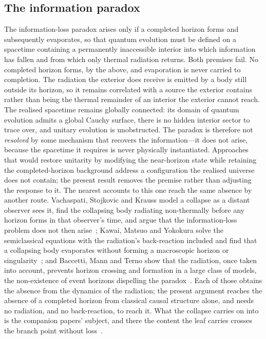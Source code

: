 \documentclass[11pt,a4paper]{article}
\theoremstyle{plain}
\theoremstyle{remark}
\begin{document}
\subsection*{The information paradox}
The information-loss paradox arises only if a completed horizon forms and subsequently evaporates, so that quantum evolution must be defined on a spacetime containing a permanently inaccessible interior into which information has fallen and from which only thermal radiation returns. Both premises fail. No completed horizon forms, by the above, and evaporation is never carried to completion. The radiation the exterior does receive is emitted by a body still outside its horizon, so it remains correlated with a source the exterior contains rather than being the thermal remainder of an interior the exterior cannot reach. The realised spacetime remains globally connected: its domain of quantum evolution admits a global Cauchy surface, there is no hidden interior sector to trace over, and unitary evolution is unobstructed. The paradox is therefore not \emph{resolved} by some mechanism that recovers the information---it does not arise, because the spacetime it requires is never physically instantiated. Approaches that would restore unitarity by modifying the near-horizon state while retaining the completed-horizon background address a configuration the realised universe does not contain; the present result removes the premise rather than adjusting the response to it. The nearest accounts to this one reach the same absence by another route. Vachaspati, Stojkovic and Krauss model a collapse as a distant observer sees it, find the collapsing body radiating non-thermally before any horizon forms in that observer's time, and argue that the information-loss problem does not then arise~\cite{Vachaspati2007}; Kawai, Matsuo and Yokokura solve the semiclassical equations with the radiation's back-reaction included and find that a collapsing body evaporates without forming a macroscopic horizon or singularity~\cite{KawaiMatsuoYokokura2013}; and Baccetti, Mann and Terno show that the radiation, once taken into account, prevents horizon crossing and formation in a large class of models, the non-existence of event horizons dispelling the paradox~\cite{Baccetti2017}. Each of those obtains the absence from the dynamics of the radiation; the present argument reaches the absence of a completed horizon from classical causal structure alone, and needs no radiation, and no back-reaction, to reach it. What the collapse carries on into is the companion papers' subject, and there the content the leaf carries crosses the branch point without loss~\cite{JanzenCRframework}.
\end{document}
